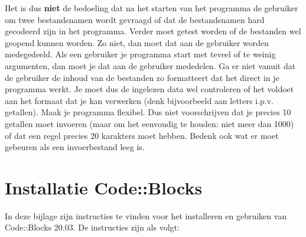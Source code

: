 \documentclass[a4paper,10pt,fleqn,twoside]{article}
\begin{document}
Het is dus \textbf{niet} de bedoeling dat na het starten van het programma de gebruiker om twee bestandsnamen wordt gevraagd of dat de bestandsnamen hard gecodeerd zijn in het programma. Verder moet getest worden of de bestanden wel geopend kunnen worden. Zo niet, dan moet dat aan de gebruiker worden medegedeeld. Als een gebruiker je programma start met teveel of te weinig argumenten, dan moet je dat aan de gebruiker mededelen. Ga er niet vanuit dat de gebruiker de inhoud van de bestanden zo formatteert dat het direct in je programma werkt. Je moet dus de ingelezen data wel controleren of het voldoet aan het formaat dat je kan verwerken (denk bijvoorbeeld aan letters i.p.v. getallen). Maak je programma flexibel. Dus niet voorschrijven dat je precies 10 getallen moet invoeren (maar om het eenvoudig te houden: niet meer dan 1000) of dat een regel precies 20 karakters moet hebben. Bedenk ook wat er moet gebeuren als een invoerbestand leeg is.



\appendix

\section{Installatie Code::Blocks}
\label{sec:installcodeblocks}

In deze bijlage zijn instructies te vinden voor het installeren en gebruiken van Code::Blocks 20.03. De instructies zijn als volgt:
\end{document}
